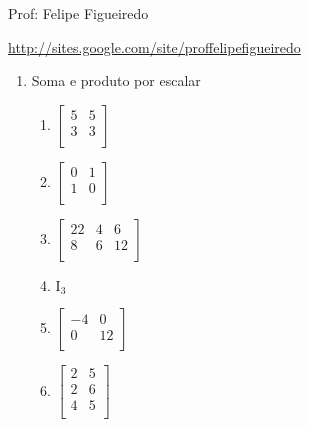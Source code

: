 \documentclass[a4paper]{article}
\begin{document}
\parbox[c]{.825\textwidth}{\raggedright%
{Prof: Felipe Figueiredo\par}
{\url{http://sites.google.com/site/proffelipefigueiredo}}

\vspace{1cm}
}


\begin{multicols}{2}

  \begin{enumerate}
  \item Soma e produto por escalar

    \begin{enumerate}
    \item
      $  \begin{bmatrix}
        5 & 5\\
        3 & 3\\
      \end{bmatrix}
      $

    \item 
      $
      \begin{bmatrix}
        0 & 1\\
        1 & 0\\
      \end{bmatrix}
      $

    \item 
      $
      \begin{bmatrix}
        22 & 4 & 6\\
        8 & 6 & 12\\
      \end{bmatrix}
      $

    \item $\mathrm{I}_3$
      
    \item 
      $
      \begin{bmatrix}
        -4 & 0\\
        0 & 12\\
      \end{bmatrix}
      $

    \item 
      $ 
      \begin{bmatrix}
        2 & 5\\
        2 & 6\\
        4 & 5\\
      \end{bmatrix}
      $


\end{enumerate}
\end{enumerate}
\end{multicols}
\end{document}
